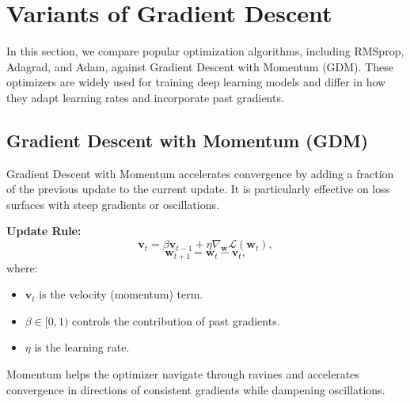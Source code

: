 \documentclass{article}
\begin{document}
% 
% 


\section{Variants of Gradient Descent}

In this section, we compare popular optimization algorithms, including RMSprop, Adagrad, and Adam, against Gradient Descent with Momentum (GDM). These optimizers are widely used for training deep learning models and differ in how they adapt learning rates and incorporate past gradients.

\subsection{Gradient Descent with Momentum (GDM)}
Gradient Descent with Momentum accelerates convergence by adding a fraction of the previous update to the current update. It is particularly effective on loss surfaces with steep gradients or oscillations.

\textbf{Update Rule:}
\[
\mathbf{v}_t = \beta \mathbf{v}_{t-1} + \eta \nabla_{\mathbf{w}} \mathcal{L}(\mathbf{w}_t),
\]
\[
\mathbf{w}_{t+1} = \mathbf{w}_t - \mathbf{v}_t,
\]
where:
\begin{itemize}
    \item $\mathbf{v}_t$ is the velocity (momentum) term.
    \item $\beta \in [0, 1)$ controls the contribution of past gradients.
    \item $\eta$ is the learning rate.
\end{itemize}

Momentum helps the optimizer navigate through ravines and accelerates convergence in directions of consistent gradients while dampening oscillations.
\end{document}
